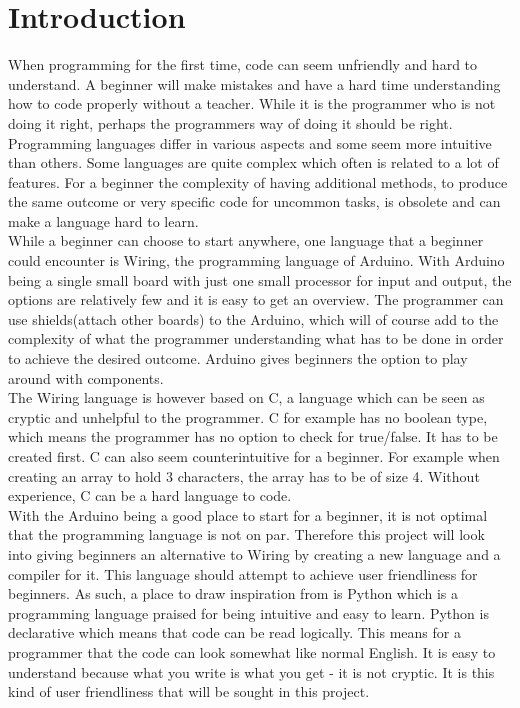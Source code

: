 \chapter{Introduction}
When programming for the first time, code can seem unfriendly and hard to understand. A beginner will make mistakes and have a hard time understanding how to code properly without a teacher. While it is the programmer who is not doing it right, perhaps the programmers way of doing it should be right. \\

Programming languages differ in various aspects and some seem more intuitive than others. Some languages are quite complex which often is related to a lot of features. For a beginner the complexity of having additional methods, to produce the same outcome or very specific code for uncommon tasks, is obsolete and can make a language hard to learn. \\

While a beginner can choose to start anywhere, one language that a beginner could encounter is Wiring, the programming language of Arduino. With Arduino being a single small board with just one small processor for input and output, the options are relatively few and it is easy to get an overview. The programmer can use shields(attach other boards) to the Arduino, which will of course add to the complexity of what the programmer understanding what has to be done in order to achieve the desired outcome. Arduino gives beginners the option to play around with components.\\

The Wiring language is however based on C, a language which can be seen as cryptic and unhelpful to the programmer. C for example has no boolean type, which means the programmer has no option to check for true/false. It has to be created first. C can also seem counterintuitive for a beginner. For example when creating an array to hold 3 characters, the array has to be of size 4.  Without experience, C can be a hard language to code. \\

With the Arduino being a good place to start for a beginner, it is not optimal that the programming language is not on par. Therefore this project will look into giving beginners an alternative to Wiring by creating a new language and a compiler for it. This language should attempt to achieve user friendliness for beginners. As such, a place to draw inspiration from is Python which is a programming language praised for being intuitive and easy to learn. Python is declarative which means that code can be read logically. This means for a programmer that the code can look somewhat like normal English. It is easy to understand because what you write is what you get - it is not cryptic. It is this kind of user friendliness that will be sought in this project.